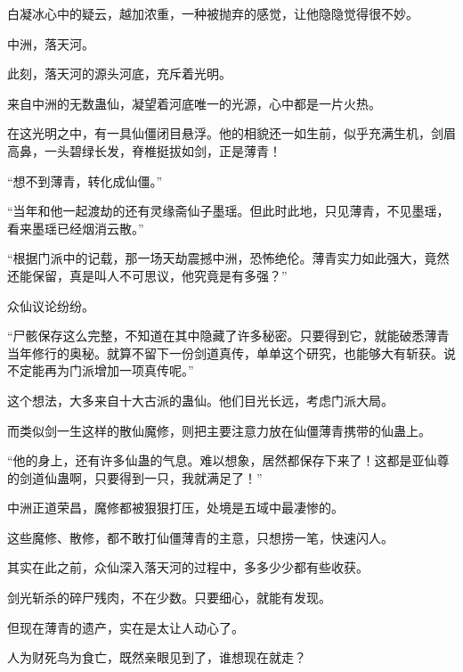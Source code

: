 \begin{this_body}
白凝冰心中的疑云，越加浓重，一种被抛弃的感觉，让他隐隐觉得很不妙。

中洲，落天河。

此刻，落天河的源头河底，充斥着光明。

来自中洲的无数蛊仙，凝望着河底唯一的光源，心中都是一片火热。

在这光明之中，有一具仙僵闭目悬浮。他的相貌还一如生前，似乎充满生机，剑眉高鼻，一头碧绿长发，脊椎挺拔如剑，正是薄青！

“想不到薄青，转化成仙僵。”

“当年和他一起渡劫的还有灵缘斋仙子墨瑶。但此时此地，只见薄青，不见墨瑶，看来墨瑶已经烟消云散。”

“根据门派中的记载，那一场天劫震撼中洲，恐怖绝伦。薄青实力如此强大，竟然还能保留，真是叫人不可思议，他究竟是有多强？”

众仙议论纷纷。

“尸骸保存这么完整，不知道在其中隐藏了许多秘密。只要得到它，就能破悉薄青当年修行的奥秘。就算不留下一份剑道真传，单单这个研究，也能够大有斩获。说不定能再为门派增加一项真传呢。”

这个想法，大多来自十大古派的蛊仙。他们目光长远，考虑门派大局。

而类似剑一生这样的散仙魔修，则把主要注意力放在仙僵薄青携带的仙蛊上。

“他的身上，还有许多仙蛊的气息。难以想象，居然都保存下来了！这都是亚仙尊的剑道仙蛊啊，只要得到一只，我就满足了！”

中洲正道荣昌，魔修都被狠狠打压，处境是五域中最凄惨的。

这些魔修、散修，都不敢打仙僵薄青的主意，只想捞一笔，快速闪人。

其实在此之前，众仙深入落天河的过程中，多多少少都有些收获。

剑光斩杀的碎尸残肉，不在少数。只要细心，就能有发现。

但现在薄青的遗产，实在是太让人动心了。

人为财死鸟为食亡，既然亲眼见到了，谁想现在就走？

\end{this_body}

